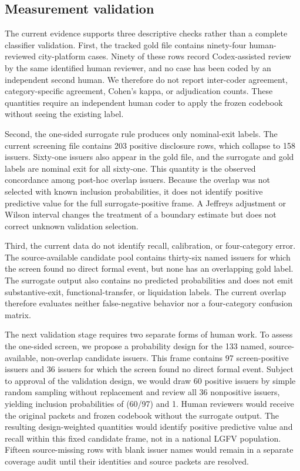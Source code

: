 \subsection{Measurement validation}

The current evidence supports three descriptive checks rather than a complete
classifier validation. First, the tracked gold file contains ninety-four
human-reviewed city-platform cases. Ninety of these rows record Codex-assisted
review by the same identified human reviewer, and no case has been coded by an
independent second human. We therefore do not report inter-coder agreement,
category-specific agreement, Cohen's kappa, or adjudication counts. These
quantities require an independent human coder to apply the frozen codebook
without seeing the existing label.

Second, the one-sided surrogate rule produces only nominal-exit labels. The
current screening file contains 203 positive disclosure rows, which collapse
to 158 issuers. Sixty-one issuers also appear in the gold file, and the
surrogate and gold labels are nominal exit for all sixty-one. This quantity is
the observed concordance among post-hoc overlap issuers. Because the overlap
was not selected with known inclusion probabilities, it does not identify
positive predictive value for the full surrogate-positive frame. A Jeffreys
adjustment or Wilson interval changes the treatment of a boundary estimate but
does not correct unknown validation selection.

Third, the current data do not identify recall, calibration, or four-category
error. The source-available candidate pool contains thirty-six named issuers
for which the screen found no direct formal event, but none has an overlapping
gold label. The surrogate output also contains no predicted probabilities and
does not emit substantive-exit, functional-transfer, or liquidation labels.
The current overlap therefore evaluates neither false-negative behavior nor a
four-category confusion matrix.

The next validation stage requires two separate forms of human work. To assess
the one-sided screen, we propose a probability design for the 133 named,
source-available, non-overlap candidate issuers. This frame contains 97
screen-positive issuers and 36 issuers for which the screen found no direct
formal event. Subject to approval of the validation design, we would draw 60
positive issuers by simple random sampling without replacement and review all
36 nonpositive issuers, yielding inclusion probabilities of (60/97) and 1.
Human reviewers would receive the original packets and frozen codebook without
the surrogate output. The resulting design-weighted quantities would identify
positive predictive value and recall within this fixed candidate frame, not
in a national LGFV population. Fifteen source-missing rows with blank issuer
names would remain in a separate coverage audit until their identities and
source packets are resolved.

